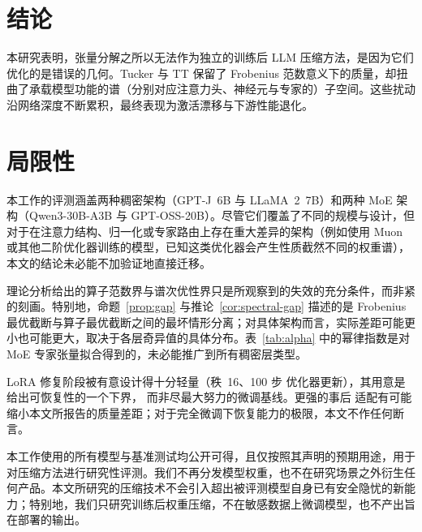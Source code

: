 \documentclass[11pt]{article}
\begin{document}
\begin{mainpart}
\section{结论}
本研究表明，张量分解之所以无法作为独立的训练后 LLM 压缩方法，是因为它们优化的是错误的几何。Tucker 与 TT 保留了 Frobenius 范数意义下的质量，却扭曲了承载模型功能的谱（分别对应注意力头、神经元与专家的）子空间。这些扰动沿网络深度不断累积，最终表现为激活漂移与下游性能退化。

\section{局限性}

本工作的评测涵盖两种稠密架构（GPT-J~6B 与 LLaMA~2~7B）和两种 MoE 架构（Qwen3-30B-A3B 与 GPT-OSS-20B）。尽管它们覆盖了不同的规模与设计，但对于在注意力结构、归一化或专家路由上存在重大差异的架构（例如使用 Muon 或其他二阶优化器训练的模型，已知这类优化器会产生性质截然不同的权重谱），本文的结论未必能不加验证地直接迁移。

理论分析给出的算子范数界与谱次优性界只是所观察到的失效的充分条件，而非紧的刻画。特别地，命题~\ref{prop:gap} 与推论~\ref{cor:spectral-gap} 描述的是 Frobenius 最优截断与算子最优截断之间的最坏情形分离；对具体架构而言，实际差距可能更小也可能更大，取决于各层奇异值的具体分布。表~\ref{tab:alpha} 中的幂律指数是对 MoE 专家张量拟合得到的，未必能推广到所有稠密层类型。

LoRA 修复阶段被有意设计得十分轻量（秩~16、100 步
优化器更新），其用意是给出可恢复性的一个下界，
而非尽最大努力的微调基线。更强的事后
适配有可能缩小本文所报告的质量差距；对于完全微调下恢复能力的极限，本文不作任何断言。

本工作使用的所有模型与基准测试均公开可得，且仅按照其声明的预期用途，用于对压缩方法进行研究性评测。我们不再分发模型权重，也不在研究场景之外衍生任何产品。本文所研究的压缩技术不会引入超出被评测模型自身已有安全隐忧的新能力；特别地，我们只研究训练后权重压缩，不在敏感数据上微调模型，也不产出旨在部署的输出。


\end{mainpart}
\end{document}
